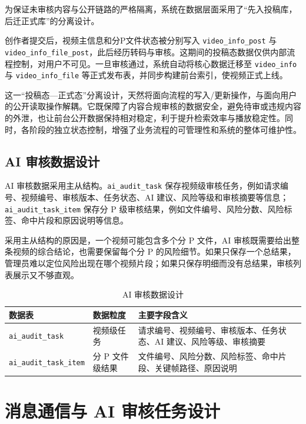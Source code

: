 为保证未审核内容与公开链路的严格隔离，系统在数据层面采用了“先入投稿库，后迁正式库”的分离设计。

创作者提交后，视频主信息和分P文件状态被分别写入 \texttt{video\_info\_post} 与 \texttt{video\_info\_file\_post}，此后经历转码与审核。这期间的投稿态数据仅供内部流程控制，对用户不可见。一旦审核通过，系统自动将核心数据迁移至 \texttt{video\_info} 与 \texttt{video\_info\_file} 等正式发布表，并同步构建前台索引，使视频正式上线。

这一“投稿态—正式态”分离设计，天然将面向流程的写入/更新操作，与面向用户的公开读取操作解耦。它既保障了内容合规审核的数据安全，避免待审或违规内容的外泄，也让前台公开数据保持相对稳定，利于提升检索效率与播放稳定性。同时，各阶段的独立状态控制，增强了业务流程的可管理性和系统的整体可维护性。

\subsection{AI 审核数据设计}
\label{subsec:ai-audit-data-design}

AI 审核数据采用主从结构。\texttt{ai\_audit\_task} 保存视频级审核任务，例如请求编号、视频编号、审核版本、任务状态、AI 建议、风险等级和审核摘要等信息；\texttt{ai\_audit\_task\_item} 保存分 P 级审核结果，例如文件编号、风险分数、风险标签、命中片段和原因说明等信息。

采用主从结构的原因是，一个视频可能包含多个分 P 文件，AI 审核既需要给出整条视频的综合结论，也需要保留每个分 P 的风险细节。如果只保存一个总结果，管理员难以定位风险出现在哪个视频片段；如果只保存明细而没有总结果，审核列表展示又不够直观。

\begin{table}[htbp]
    \centering
    \caption{AI 审核数据设计}
    \label{tab:ai-audit-data-design}
    \begin{tabular}{p{}p{}p{}}
    \hline
    \textbf{数据表} & \textbf{数据粒度} & \textbf{主要字段含义} \\
    \hline
    \texttt{ai\_audit\_task} & 视频级任务 & 请求编号、视频编号、审核版本、任务状态、AI 建议、风险等级、审核摘要 \\
    \texttt{ai\_audit\_task\_item} & 分 P 文件级结果 & 文件编号、风险分数、风险标签、命中片段、关键帧路径、原因说明 \\
    \hline
    \end{tabular}
\end{table}

\section{消息通信与 AI 审核任务设计}
\label{sec:message-async-design}

